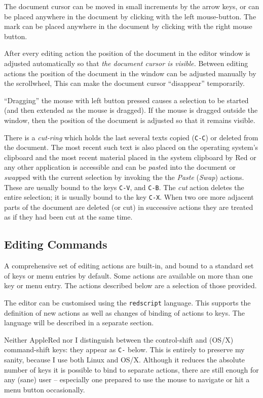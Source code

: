 \documentclass[11pt,a4paper]{article}
\begin{document}
The document cursor can be moved in small increments by the arrow keys,
or can be placed anywhere in the document by clicking with the left
mouse-button. The mark can be placed anywhere in the document by
clicking with the right mouse button.


After every editing action the position of the document in the editor
window is adjusted automatically so that \emph{the document cursor is
visible.} Between editing actions the position of the document in the
window can be adjusted manually by the scrollwheel, This can make the
document cursor ``disappear'' temporarily.

``Dragging'' the mouse with left button pressed causes a selection to be
started (and then extended as the mouse is dragged). If the mouse is
dragged outside the window, then the position of the document is
adjusted so that it remains visible.

There is a \emph{cut-ring} which holds the last several texts copied
(\texttt{C-C}) or deleted from the document. The most recent such text
is also placed on the operating system's clipboard and the most recent
material placed in the system clipboard by Red or any other application
is accessible and can be \emph{paste}d into the document or
\emph{swap}ped with the current selection by invoking the the
\emph{Paste} (\emph{Swap}) actions. These are usually bound to the keys
\texttt{C-V}, and \texttt{C-B}. The \emph{cut} action deletes the entire
selection; it is usually bound to the key \texttt{C-X}. When two ore
more adjacent parts of the document are deleted (or cut) in successive
actions they are treated as if they had been cut at the same time.

\hypertarget{editing-commands}{\subsection{Editing Commands}\label{editing-commands}}

A comprehensive set of editing actions are built-in, and bound to
a standard set of keys or menu entries by default. Some actions are
available on more than one key or menu entry. The actions described
below are a selection of those provided.

The editor can be customised using the \texttt{redscript} language. This
supports the definition of new actions as well as changes of binding of
actions to keys. The language will be described in a separate section.

Neither AppleRed nor I distinguish between the control-shift and (OS/X)
command-shift keys: they appear as \texttt{C-} below. This is entirely
to preserve my sanity, because I use both Linux and OS/X. Although it
reduces the absolute number of keys it is possible to bind to separate
actions, there are still enough for any (sane) user -- especially one
prepared to use the mouse to navigate or hit a menu button occasionally.
\end{document}
